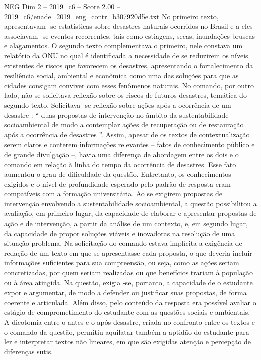 \begin{textsample}{NEG Dim 2 – 2019\_c6 – Score 2.00 – 2019\_c6/enade\_2019\_eng\_contr\_b307920d5e.txt}
No primeiro texto, apresentavam -se estatísticas sobre desastres naturais ocorridos no Brasil e a eles associavam -se eventos recorrentes, tais como estiagens, secas, inundações bruscas e alagamentos.
O segundo texto complementava o primeiro, nele constava um relatório da ONU no qual é identificada a necessidade de se reduzirem os níveis existentes de riscos que favorecem os desastres, apresentando o fortalecimento da resiliência social, ambiental e econômica como uma das soluções para que as cidades consigam conviver com esses fenômenos naturais.
No comando, por outro lado, não se solicitava reflexão sobre os riscos de futuros desastres, temática do segundo texto.
Solicitava -se reflexão sobre ações após a ocorrência de um desastre : “ duas propostas de intervenção no âmbito da sustentabilidade socioambiental de modo a contemplar ações de recuperação ou de restauração após a ocorrência de desastres ”.
Assim, apesar de os textos de contextualização serem claros e conterem informações relevantes – fatos de conhecimento público e de grande divulgação –, havia uma diferença de abordagem entre os dois e o comando em relação à linha do tempo da ocorrência de desastres.
Esse fato aumentou o grau de dificuldade da questão.
Entretanto, os conhecimentos exigidos e o nível de profundidade esperado pelo padrão de resposta eram compatíveis com a formação universitária.
Ao se exigirem propostas de intervenção envolvendo a sustentabilidade socioambiental, a questão possibilitou a avaliação, em primeiro lugar, da capacidade de elaborar e apresentar propostas de ação e de intervenção, a partir da análise de um contexto, e, em segundo lugar, da capacidade de propor soluções viáveis e inovadoras na resolução de uma situação-problema.
Na solicitação do comando estava implícita a exigência de redação de um texto em que se apresentasse cada proposta, o que deveria incluir informações suficientes para sua compreensão, ou seja, como as ações seriam concretizadas, por quem seriam realizadas ou que benefícios trariam à população ou à área atingida.
Na questão, exigia -se, portanto, a capacidade de o estudante expor e argumentar, de modo a defender ou justificar suas propostas, de forma coerente e articulada.
Além disso, pelo conteúdo da resposta era possível avaliar o estágio de comprometimento do estudante com as questões sociais e ambientais.
A dicotomia entre o antes e o após desastre, criada no confronto entre os textos e o comando da questão, permitiu aquilatar também a aptidão do estudante para ler e interpretar textos não lineares, em que são exigidas atenção e percepção de diferenças sutis.

\end{textsample}
